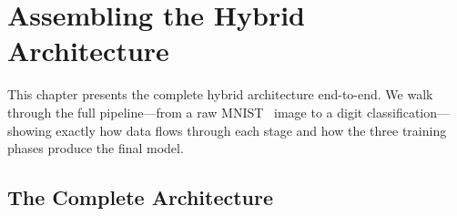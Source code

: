 \chapter{Assembling the Hybrid Architecture}
\label{ch:assembly}

This chapter presents the complete hybrid architecture end-to-end. We
walk through the full pipeline---from a raw MNIST~\cite{lecun1998mnist} image to a digit
classification---showing exactly how data flows through each stage and
how the three training phases produce the final model.


\section{The Complete Architecture}
\label{sec:complete-arch}

